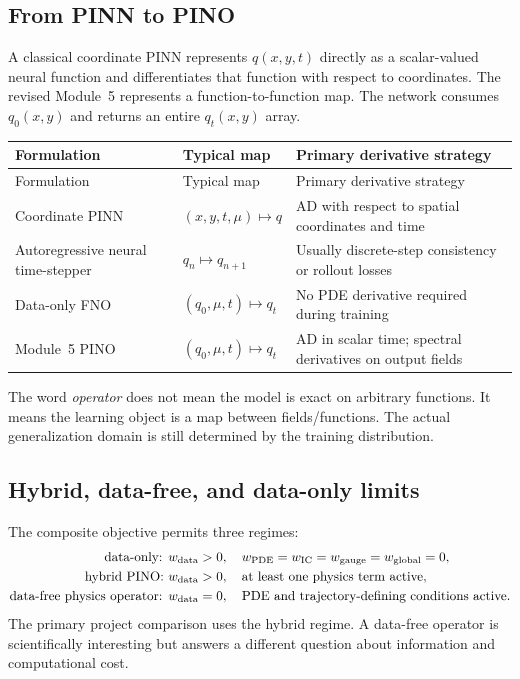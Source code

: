 \documentclass[11pt]{article}
\begin{document}
\subsection{From PINN to PINO}
A classical coordinate PINN represents $q(x,y,t)$ directly as a scalar-valued neural function and differentiates that function with respect to coordinates. The revised Module~5 represents a function-to-function map. The network consumes $q_0(x,y)$ and returns an entire $q_t(x,y)$ array.

\begin{longtable}{p{}p{}p{}}
\toprule
Formulation & Typical map & Primary derivative strategy \\
\midrule
\endfirsthead
\toprule
Formulation & Typical map & Primary derivative strategy \\
\midrule
\endhead
Coordinate PINN & $(x,y,t,\mu)\mapsto q$ & AD with respect to spatial coordinates and time \\
Autoregressive neural time-stepper & $q_n\mapsto q_{n+1}$ & Usually discrete-step consistency or rollout losses \\
Data-only FNO & $(q_0,\mu,t)\mapsto q_t$ & No PDE derivative required during training \\
Module~5 PINO & $(q_0,\mu,t)\mapsto q_t$ & AD in scalar time; spectral derivatives on output fields \\
\bottomrule
\end{longtable}

The word \emph{operator} does not mean the model is exact on arbitrary functions. It means the learning object is a map between fields/functions. The actual generalization domain is still determined by the training distribution.

\subsection{Hybrid, data-free, and data-only limits}
The composite objective permits three regimes:
\begin{align}
\text{data-only: }&w_{\rm data}>0,\quad w_{\rm PDE}=w_{\rm IC}=w_{\rm gauge}=w_{\rm global}=0,\\
\text{hybrid PINO: }&w_{\rm data}>0,\quad \text{at least one physics term active},\\
\text{data-free physics operator: }&w_{\rm data}=0,\quad \text{PDE and trajectory-defining conditions active}.
\end{align}
The primary project comparison uses the hybrid regime. A data-free operator is scientifically interesting but answers a different question about information and computational cost.
\end{document}
